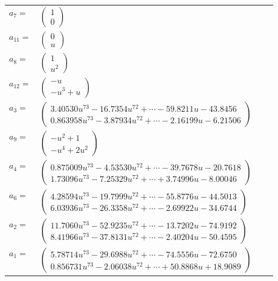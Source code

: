 \documentclass[1p]{elsarticle_modified}
\theoremstyle{definition}
\begin{document}
\begin{tabular}{m{7pt} m{180pt} m{7pt} m{180pt} }
\flushright $a_{7}=$&$\begin{pmatrix}1\\0\end{pmatrix}$ \\
\flushright $a_{11}=$&$\begin{pmatrix}0\\u\end{pmatrix}$ \\
\flushright $a_{8}=$&$\begin{pmatrix}1\\u^2\end{pmatrix}$ \\
\flushright $a_{12}=$&$\begin{pmatrix}- u\\- u^3+u\end{pmatrix}$ \\
\flushright $a_{3}=$&$\begin{pmatrix}3.40530 u^{73}-16.7354 u^{72}+\cdots-59.8211 u-43.8456\\0.863958 u^{73}-3.87934 u^{72}+\cdots-2.16199 u-6.21506\end{pmatrix}$ \\
\flushright $a_{9}=$&$\begin{pmatrix}- u^2+1\\- u^4+2 u^2\end{pmatrix}$ \\
\flushright $a_{4}=$&$\begin{pmatrix}0.875009 u^{73}-4.53530 u^{72}+\cdots-39.7678 u-20.7618\\1.73096 u^{73}-7.25329 u^{72}+\cdots+3.74996 u-8.00046\end{pmatrix}$ \\
\flushright $a_{6}=$&$\begin{pmatrix}4.28594 u^{73}-19.7999 u^{72}+\cdots-55.8776 u-44.5013\\6.03936 u^{73}-26.3358 u^{72}+\cdots-2.69922 u-34.6744\end{pmatrix}$ \\
\flushright $a_{2}=$&$\begin{pmatrix}11.7060 u^{73}-52.9235 u^{72}+\cdots-13.7202 u-74.9192\\8.41966 u^{73}-37.8131 u^{72}+\cdots-2.40204 u-50.4595\end{pmatrix}$ \\
\flushright $a_{1}=$&$\begin{pmatrix}5.78714 u^{73}-29.6988 u^{72}+\cdots-74.5556 u-72.6750\\0.856731 u^{73}-2.06038 u^{72}+\cdots+50.8868 u+18.9089\end{pmatrix}$ \\

\end{tabular}
\end{document}
